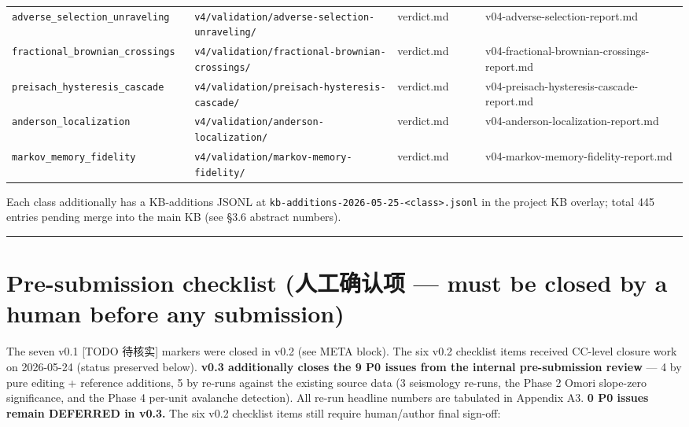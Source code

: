 \documentclass[
  11pt]{article}
\begin{document}
{\begin{longtable}[]{@{}p{0.27\linewidth}p{0.30\linewidth}p{0.13\linewidth}p{0.30\linewidth}@{}}
\texttt{adverse\_selection\_unraveling} & \texttt{v4/validation/adverse-selection-unraveling/} & verdict.md & v04-adverse-selection-report.md \\
\texttt{fractional\_brownian\_crossings} & \texttt{v4/validation/fractional-brownian-crossings/} & verdict.md & v04-fractional-brownian-crossings-report.md \\
\texttt{preisach\_hysteresis\_cascade} & \texttt{v4/validation/preisach-hysteresis-cascade/} & verdict.md & v04-preisach-hysteresis-cascade-report.md \\
\texttt{anderson\_localization} & \texttt{v4/validation/anderson-localization/} & verdict.md & v04-anderson-localization-report.md \\
\texttt{markov\_memory\_fidelity} & \texttt{v4/validation/markov-memory-fidelity/} & verdict.md & v04-markov-memory-fidelity-report.md \\
\end{longtable}
}

Each class additionally has a KB-additions JSONL at
\texttt{kb-additions-2026-05-25-<class>.jsonl} in the project KB
overlay; total 445 entries pending merge into the main KB
(see §3.6 abstract numbers).

\begin{center}\rule{0.5\linewidth}{0.5pt}\end{center}

\section{Pre-submission checklist (人工确认项 --- must be closed by a
human before any
submission)}\label{pre-submission-checklist-ux4ebaux5de5ux786eux8ba4ux9879--must-be-closed-by-a-human-before-any-submission}

The seven v0.1 {[}TODO 待核实{]} markers were closed in v0.2 (see META
block). The six v0.2 checklist items received CC-level closure work on
2026-05-24 (status preserved below). \textbf{v0.3 additionally closes
the 9 P0 issues from the internal pre-submission review} --- 4 by pure
editing + reference additions, 5 by re-runs against the existing source
data (3 seismology re-runs, the Phase 2 Omori slope-zero significance,
and the Phase 4 per-unit avalanche detection). All re-run headline
numbers are tabulated in Appendix A3. \textbf{0 P0 issues remain
DEFERRED in v0.3.} The six v0.2 checklist items still require
human/author final sign-off:
\end{document}
